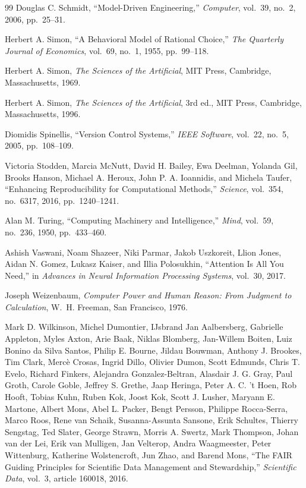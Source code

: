 \documentclass[11pt]{article}
\begin{document}
\begin{thebibliography}{99}
Douglas C. Schmidt,
``Model-Driven Engineering,''
\textit{Computer},
vol.~39,
no.~2,
2006,
pp.~25--31.

Herbert A. Simon,
``A Behavioral Model of Rational Choice,''
\textit{The Quarterly Journal of Economics},
vol.~69,
no.~1,
1955,
pp.~99--118.

Herbert A. Simon,
\textit{The Sciences of the Artificial},
MIT Press,
Cambridge, Massachusetts,
1969.

Herbert A. Simon,
\textit{The Sciences of the Artificial},
3rd ed.,
MIT Press,
Cambridge, Massachusetts,
1996.

Diomidis Spinellis,
``Version Control Systems,''
\textit{IEEE Software},
vol.~22,
no.~5,
2005,
pp.~108--109.

Victoria Stodden,
Marcia McNutt,
David H. Bailey,
Ewa Deelman,
Yolanda Gil,
Brooks Hanson,
Michael A. Heroux,
John P. A. Ioannidis,
and Michela Taufer,
``Enhancing Reproducibility for Computational Methods,''
\textit{Science},
vol.~354,
no.~6317,
2016,
pp.~1240--1241.

Alan M. Turing,
``Computing Machinery and Intelligence,''
\textit{Mind},
vol.~59,
no.~236,
1950,
pp.~433--460.

Ashish Vaswani, Noam Shazeer, Niki Parmar, Jakob Uszkoreit,
Llion Jones, Aidan N. Gomez, Lukasz Kaiser, and Illia Polosukhin,
``Attention Is All You Need,''
in \textit{Advances in Neural Information Processing Systems},
vol.~30,
2017.

Joseph Weizenbaum,
\textit{Computer Power and Human Reason: From Judgment to Calculation},
W.~H. Freeman,
San Francisco,
1976.

Mark D. Wilkinson, Michel Dumontier, IJsbrand Jan Aalbersberg,
Gabrielle Appleton, Myles Axton, Arie Baak, Niklas Blomberg,
Jan-Willem Boiten, Luiz Bonino da Silva Santos,
Philip E. Bourne, Jildau Bouwman, Anthony J. Brookes,
Tim Clark, Merc\`e Crosas, Ingrid Dillo, Olivier Dumon,
Scott Edmunds, Chris T. Evelo, Richard Finkers,
Alejandra Gonzalez-Beltran, Alasdair J. G. Gray,
Paul Groth, Carole Goble, Jeffrey S. Grethe,
Jaap Heringa, Peter A. C. 't Hoen, Rob Hooft,
Tobias Kuhn, Ruben Kok, Joost Kok,
Scott J. Lusher, Maryann E. Martone,
Albert Mons, Abel L. Packer, Bengt Persson,
Philippe Rocca-Serra, Marco Roos, Rene van Schaik,
Susanna-Assunta Sansone, Erik Schultes,
Thierry Sengstag, Ted Slater, George Strawn,
Morris A. Swertz, Mark Thompson, Johan van der Lei,
Erik van Mulligen, Jan Velterop, Andra Waagmeester,
Peter Wittenburg, Katherine Wolstencroft,
Jun Zhao, and Barend Mons,
``The FAIR Guiding Principles for Scientific Data Management and Stewardship,''
\textit{Scientific Data},
vol.~3,
article 160018,
2016.


\end{thebibliography}
\end{document}
